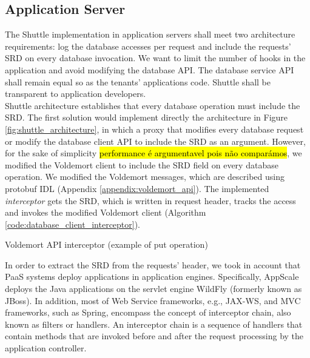 \subsection{Application Server}\label{sec:impl:normal:compute}
The Shuttle implementation in application servers shall meet two architecture requirements: log the database accesses per request and include the requests' \ac{SRD} on every database invocation. We want to limit the number of hooks in the application and avoid modifying the database \ac{API}. The database service \ac{API} shall remain equal so as the tenants' applications code. Shuttle shall be transparent to application developers.\\


Shuttle architecture establishes that every database operation must include the \acf{SRD}. The first solution would implement directly the architecture in Figure \ref{fig:shuttle_architecture}, in which a proxy that modifies every database request or modify the database client \ac{API} to include the \ac{SRD} as an argument. However, for the sake of simplicity \hl{performance é argumentavel pois não comparámos}, we modified the Voldemort client to include the \ac{SRD} field on every database operation. We modified the Voldemort messages, which are described using \acf{protobuf} \acs{IDL} (Appendix \ref{appendix:voldemort_api}). The implemented \emph{interceptor} gets the \ac{SRD}, which is written in request header, tracks the access and invokes the modified Voldemort client (Algorithm \ref{code:database_client_interceptor}).

\begin{algorithm}
\DontPrintSemicolon{}
 
\caption{Voldemort \ac{API} interceptor (example of put operation)}\label{code:database_client_interceptor}
\end{algorithm}

In order to extract the \ac{SRD} from the requests' header, we took in account that \ac{PaaS} systems deploy applications in application engines. Specifically, AppScale deploys the Java applications on the servlet engine WildFly \cite{wildfly} (formerly known as JBoss). In addition, most of Web Service frameworks, e.g., \ac{JAX-WS}, and \acf{MVC} frameworks, such as Spring, encompass the concept of interceptor chain, also known as filters or handlers. An interceptor chain is a sequence of handlers that contain methods that are invoked before and after the request processing by the application controller.


